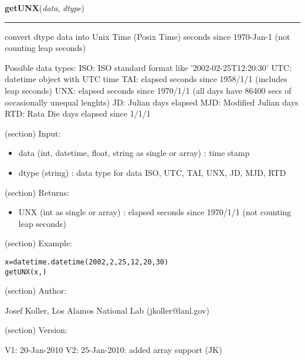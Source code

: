     \label{spacepy:ticktock:getUNX}

    \vspace{0.5ex}

\hspace{.8\funcindent}\begin{boxedminipage}{\funcwidth}

    \raggedright \textbf{getUNX}(\textit{data}, \textit{dtype})

    \vspace{-1.5ex}

    \rule{\textwidth}{0.5\fboxrule}
\setlength{\parskip}{2ex}
    convert dtype data into Unix Time (Posix Time) seconds since 1970-Jan-1
    (not counting leap seconds)

    Possible data types: ISO: ISO standard format like 
    '2002-02-25T12:20:30' UTC: datetime object with UTC time TAI: elapsed 
    seconds since 1958/1/1 (includes leap seconds) UNX: elapsed seconds 
    since 1970/1/1 (all days have 86400 secs of occasionally unequal 
    lenghts) JD: Julian days elapsed MJD: Modified Julian days RTD: Rata 
    Die days elapsed since 1/1/1

    (section) Input:

      \begin{itemize}
      \setlength{\parskip}{0.6ex}
        \item data (int, datetime, float, string as single or array) : time 
          stamp

        \item dtype (string) : data type for data ISO, UTC, TAI, UNX, JD, MJD, 
          RTD

      \end{itemize}

    (section) Returns:

      \begin{itemize}
      \setlength{\parskip}{0.6ex}
        \item UNX (int as single or array) : elapsed seconds since 1970/1/1 
          (not counting leap seconds)

      \end{itemize}

    (section) Example:

\begin{alltt}
\pysrcprompt{{\textgreater}{\textgreater}{\textgreater} }x=datetime.datetime(2002,2,25,12,20,30)
\pysrcprompt{{\textgreater}{\textgreater}{\textgreater} }getUNX(x, )
\end{alltt}
    (section) Author:

      Josef Koller, Los Alamos National Lab (jkoller@lanl.gov)

    (section) Version:

      V1: 20-Jan-2010 V2: 25-Jan-2010: added array support (JK)

\setlength{\parskip}{1ex}
    \end{boxedminipage}

